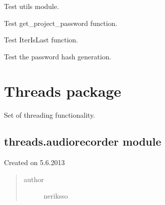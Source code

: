 \documentclass[letterpaper,10pt,english]{sphinxmanual}
\begin{document}

\begin{fulllineitems}
\label{testing:testing.TestUtils}
Test utils module.

\begin{fulllineitems}
\label{testing:testing.TestUtils.test_getpassword}
Test get\_project\_password function.

\end{fulllineitems}


\begin{fulllineitems}
\label{testing:testing.TestUtils.test_iterislast}
Test IterIsLast function.

\end{fulllineitems}


\begin{fulllineitems}
\label{testing:testing.TestUtils.test_passwordhash}
Test the password hash generation.

\end{fulllineitems}


\end{fulllineitems}



\section{Threads package}
\label{threads:threads-package}\label{threads::doc}
Set of threading functionality.


\subsection{threads.audiorecorder module}
\label{threads:threads-audiorecorder-module}\label{threads:module-threads.audiorecorder}
Created on 5.6.2013
\begin{quote}\begin{description}
\item[{author}] \leavevmode
neriksso

\end{description}\end{quote}
\end{document}
